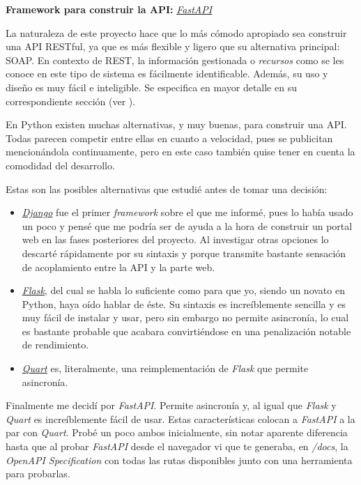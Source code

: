 \textbf{Framework para construir la API:} \href{https://fastapi.tiangolo.com/}{\textit{FastAPI}}

La naturaleza de este proyecto hace que lo más cómodo apropiado sea construir una API RESTful, ya que es más flexible y ligero que su alternativa principal: SOAP. En contexto de REST, la información gestionada o \textit{recursos} como se les conoce en este tipo de sistema es fácilmente identificable. Además, su uso y diseño es muy fácil e inteligible. Se especifica en mayor detalle en su correspondiente sección (ver ).

En Python existen muchas alternativas, y muy buenas, para construir una API. Todas parecen competir entre ellas en cuanto a velocidad, pues se publicitan mencionándola continuamente, pero en este caso también quise tener en cuenta la comodidad del desarrollo.

Estas son las posibles alternativas que estudié antes de tomar una decisión:
\begin{itemize}
    \item \href{https://www.djangoproject.com/}{\textit{Django}} fue el primer \textit{framework} sobre el que me informé, pues lo había usado un poco y pensé que me podría ser de ayuda a la hora de construir un portal web en las fases posteriores del proyecto. Al investigar otras opciones lo descarté rápidamente por su sintaxis y porque transmite bastante sensación de acoplamiento entre la API y la parte web.
    \item \href{https://flask.palletsprojects.com/en/2.2.x/}{\textit{Flask}}, del cual se habla lo suficiente como para que yo, siendo un novato en Python, haya oído hablar de éste. Su sintaxis es increíblemente sencilla y es muy fácil de instalar y usar, pero sin embargo no permite asincronía, lo cual es bastante probable que acabara convirtiéndose en una penalización notable de rendimiento.
    \item \href{https://quart.palletsprojects.com/en/latest/}{\textit{Quart}} es, literalmente, una reimplementación de \textit{Flask} que permite asincronía.
\end{itemize}

Finalmente me decidí por \textit{FastAPI}. Permite asincronía y, al igual que \textit{Flask} y \textit{Quart} es increíblemente fácil de usar. Estas características colocan a \textit{FastAPI} a la par con \textit{Quart}. Probé un poco ambos inicialmente, sin notar aparente diferencia hasta que al probar \textit{FastAPI} desde el navegador vi que te generaba, en \textit{/docs}, la \textit{OpenAPI Specification} con todas las rutas disponibles junto con una herramienta para probarlas.

